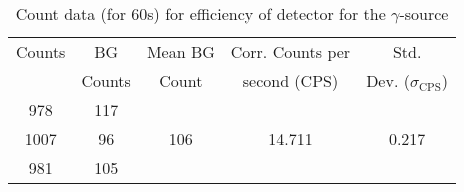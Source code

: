 \begin{table}[H]
    \centering
    \begin{tabular}{|c|c|c|c|c|}\hline
    Counts & BG & Mean BG  & Corr. Counts per & Std.\\
    & Counts & Count  & second (CPS) &  Dev. ($\sigma_\text{CPS}$)\\\hline
    978 & 117 & \multirow{3}{*}{106}& \multirow{3}{*}{14.711}& \multirow{3}{*}{0.217}\\
    1007 & 96 &  &  & \\
    981 & 105 &  &  & \\\hline
    \end{tabular}
    \caption{Count data (for 60s) for efficiency of detector for the $\gamma$-source}
    \label{t5}
\end{table}